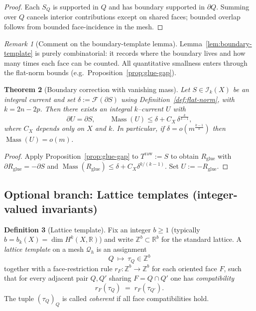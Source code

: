 \documentclass[11pt]{article}
\numberwithin{equation}{section}  %
\theoremstyle{plain}
\newtheorem{theorem}{Theorem}[section]
\theoremstyle{definition}
\newtheorem{definition}[theorem]{Definition}
\theoremstyle{remark}
\newtheorem{remark}[theorem]{Remark}
\newcommand{\R}{\mathbb{R}}
\newcommand{\Z}{\mathbb{Z}}
\DeclareMathOperator{\Mass}{Mass}
\begin{document}
\begin{proof}
Each $S_Q$ is supported in $Q$ and has boundary supported in $\partial Q$. Summing over $Q$ cancels interior contributions
except on shared faces; bounded overlap follows from bounded face-incidence in the mesh.
\end{proof}


\begin{remark}[Comment on the boundary-template lemma]\label{rem:boundary-template-comment}
Lemma~\ref{lem:boundary-template} is purely combinatorial: it records where the boundary lives and how many times each face
can be counted.  All quantitative smallness enters through the flat-norm bounds (e.g.\ Proposition~\ref{prop:glue-gap}).
\end{remark}



\begin{theorem}[Boundary correction with vanishing mass]\label{thm:boundary-correction}
Let $S\in\mathcal I_k(X)$ be an integral current and set $\delta:=\mathcal F(\partial S)$ using Definition~\ref{def:flat-norm},
with $k=2n-2p$.  Then there exists an integral $k$--current $U$ with
\[
\partial U=\partial S,\qquad \Mass(U)\le \delta + C_X\,\delta^{\frac{k}{k-1}},
\]
where $C_X$ depends only on $X$ and $k$.  In particular, if $\delta=o\!\left(m^{\frac{k-1}{k}}\right)$ then $\Mass(U)=o(m)$.
\end{theorem}

\begin{proof}
Apply Proposition~\ref{prop:glue-gap} to $T^{\mathrm{raw}}:=S$ to obtain $R_{\mathrm{glue}}$ with $\partial R_{\mathrm{glue}}=-\partial S$
and $\Mass(R_{\mathrm{glue}})\le \delta + C_X\delta^{k/(k-1)}$.  Set $U:=-R_{\mathrm{glue}}$.
\end{proof}
%
\subsection*{Optional branch: Lattice templates (integer-valued invariants)}

\begin{definition}[Lattice template]\label{def:lattice-template}
Fix an integer $b\ge 1$ (typically $b=b_k(X)=\dim H^k(X,\R)$) and write $\Z^b\subset \R^b$ for the standard lattice.
A \emph{lattice template} on a mesh $\mathcal Q_h$ is an assignment
\[
  Q\ \longmapsto\ \tau_Q\in \Z^b
\]
together with a face-restriction rule $r_F:\Z^b\to \Z^b$ for each oriented face $F$,
such that for every adjacent pair $Q,Q'$ sharing $F=Q\cap Q'$ one has \emph{compatibility}
\[
  r_F(\tau_Q)\;=\;r_F(\tau_{Q'}).
\]
The tuple $(\tau_Q)_Q$ is called \emph{coherent} if all face compatibilities hold.
\end{definition}
\end{document}

